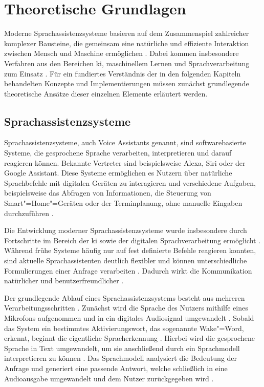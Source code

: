 \chapter{Theoretische Grundlagen}
\label{chap:Theoretische_Grundlagen}
Moderne Sprachassistenzsysteme basieren auf dem Zusammenspiel zahlreicher komplexer Bausteine, die gemeinsam eine natürliche und effiziente Interaktion zwischen Mensch und Maschine ermöglichen \autocite{voiceassistantIntroduction}. Dabei kommen insbesondere Verfahren aus den Bereichen \gls{ki}, maschinellem Lernen und Sprachverarbeitung zum Einsatz \autocite{voiceassistantIntroduction,comprehensiveOverviewLLM}. Für ein fundiertes Verständnis der in den folgenden Kapiteln behandelten Konzepte und Implementierungen müssen zunächst grundlegende theoretische Ansätze dieser einzelnen Elemente erläutert werden.


\section{Sprachassistenzsysteme}
\label{sec:Sprachassistenzsysteme}
Sprachassistenzsysteme, auch Voice Assistants genannt, sind softwarebasierte Systeme, die gesprochene Sprache verarbeiten, interpretieren und darauf reagieren können. Bekannte Vertreter sind beispielsweise Alexa, Siri oder der Google Assistant. Diese Systeme ermöglichen es Nutzern über natürliche Sprachbefehle mit digitalen Geräten zu interagieren und verschiedene Aufgaben, beispielsweise das Abfragen von Informationen, die Steuerung von Smart"=Home"=Geräten oder der Terminplanung, ohne manuelle Eingaben durchzuführen \autocite{voiceassistantIntroduction}.

Die Entwicklung moderner Sprachassistenzsysteme wurde insbesondere durch Fortschritte im Bereich der \gls{ki} sowie der digitalen Sprachverarbeitung ermöglicht \autocite{voiceassistantIntroduction, comprehensiveOverviewLLM, speechtoTextTexttoSpeechRecognition}. Während frühe Systeme häufig nur auf fest definierte Befehle reagieren konnten, sind aktuelle Sprachassistenten deutlich flexibler und können unterschiedliche Formulierungen einer Anfrage verarbeiten \autocite{voiceassistantIntroduction}. Dadurch wirkt die Kommunikation natürlicher und benutzerfreundlicher \autocite{voiceBench}.

Der grundlegende Ablauf eines Sprachassistenzsystems besteht aus mehreren Verarbeitungsschritten \autocite{speechtoTextTexttoSpeechRecognition}. Zunächst wird die Sprache des Nutzers mithilfe eines Mikrofons aufgenommen und in ein digitales Audiosignal umgewandelt \autocite{speechtoTextTexttoSpeechRecognition, voiceassistantIntroduction}. Sobald das System ein bestimmtes Aktivierungswort, das sogenannte Wake"=Word, erkennt, beginnt die eigentliche Spracherkennung \autocite{voiceassistantIntroduction, tiredWakeWords}. Hierbei wird die gesprochene Sprache in Text umgewandelt, um sie anschließend durch ein Sprachmodell interpretieren zu können \autocite{voiceassistantIntroduction, comprehensiveOverviewLLM}. Das Sprachmodell analysiert die Bedeutung der Anfrage und generiert eine passende Antwort, welche schließlich in eine Audioausgabe umgewandelt und dem Nutzer zurückgegeben wird \autocite{voiceassistantIntroduction}.

